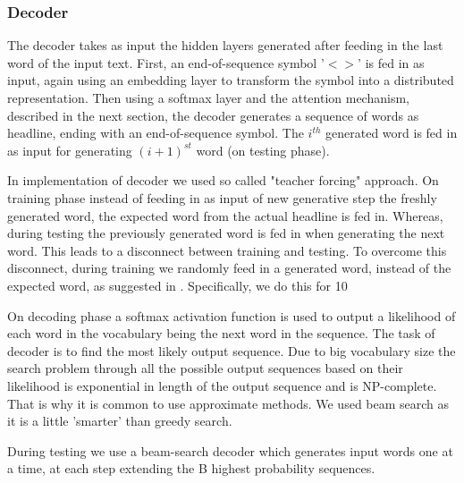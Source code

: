 \subsubsection{Decoder}
The decoder takes as input the hidden layers generated after feeding in the last word of the input text. First, an end-of-sequence symbol '$<>$' is fed in as input, again using an embedding layer to transform the symbol into a distributed representation. Then using a softmax layer and the attention mechanism, described in the next section, the decoder generates a sequence of words as headline, ending with an end-of-sequence symbol. The $i^{th}$ generated word is fed in as input for generating $(i+1)^{st}$ word (on testing phase). 


In implementation of decoder we used so called "teacher forcing" \cite{deep_learning_basic} approach. On training phase instead of feeding in as input of new generative step the freshly generated word, the expected word from the actual headline is fed in. Whereas, during testing the previously
generated word is fed in when generating the next word. This leads to a disconnect between training
and testing. To overcome this disconnect, during training we randomly feed in a generated word,
instead of the expected word, as suggested in \cite{scheduled_sampling}. Specifically, we do this for 10%

On decoding phase a softmax activation function is used to output a likelihood of each word in the vocabulary being the next word in the sequence. The task of decoder is to find the most likely output sequence. Due to big vocabulary size the search problem through all the possible output sequences based on their likelihood is exponential in length of the output sequence and is NP-complete. That is why it is common to use approximate methods. We used beam search as it is a little 'smarter' than greedy search.


During testing 
we use a beam-search decoder which generates input words one at a
time, at each step extending the B highest probability sequences.


